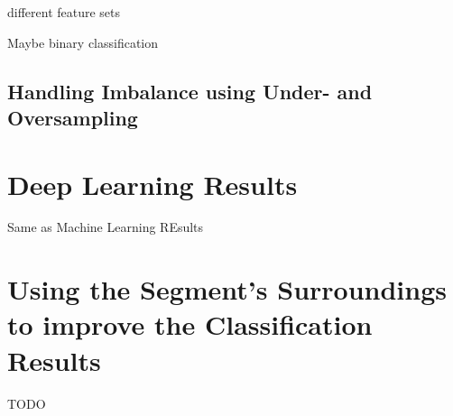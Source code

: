 different feature sets

Maybe binary classification






\subsection{Handling Imbalance using Under- and Oversampling}


\section{Deep Learning Results}
\label{sec:deep_learning_results}

Same as Machine Learning REsults







\section{Using the Segment's Surroundings to improve the Classification Results}

TODO




